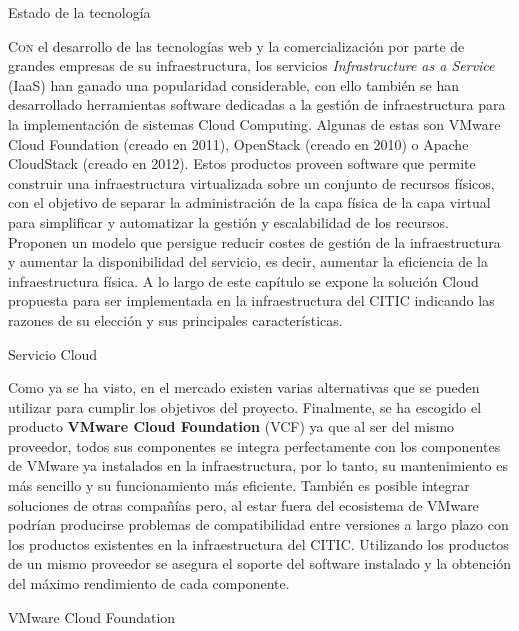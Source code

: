 \begin{chapter}{Estado de la tecnología}
    
    \lettrine{C}{on} el desarrollo de las tecnologías web y la comercialización por parte de grandes empresas de su infraestructura, los servicios \textit{Infrastructure as a Service} (IaaS) han ganado una popularidad considerable, con ello también se han desarrollado herramientas software dedicadas a la gestión de infraestructura para la implementación de sistemas Cloud Computing. Algunas de estas son VMware Cloud Foundation (creado en 2011), OpenStack (creado en 2010) o Apache CloudStack (creado en 2012). Estos productos proveen software que permite construir una infraestructura virtualizada sobre un conjunto de recursos físicos, con el objetivo de separar la administración de la capa física de la capa virtual para simplificar y automatizar la gestión y escalabilidad de los recursos. Proponen un modelo que persigue reducir costes de gestión de la infraestructura y aumentar la disponibilidad del servicio, es decir, aumentar la eficiencia de la infraestructura física.
    A lo largo de este capítulo se expone la solución Cloud propuesta para ser implementada en la infraestructura del CITIC indicando las razones de su elección y sus principales características.

\begin{section}{Servicio Cloud}    

    Como ya se ha visto, en el mercado existen varias alternativas que se pueden utilizar para cumplir los objetivos del proyecto. Finalmente, se ha escogido el producto \textbf{VMware Cloud Foundation} (VCF) ya que al ser del mismo proveedor, todos sus componentes se integra perfectamente con los componentes de VMware ya instalados en la infraestructura, por lo tanto, su mantenimiento es más sencillo y su funcionamiento más eficiente. También es posible integrar soluciones de otras compañías pero, al estar fuera del ecosistema de VMware podrían producirse problemas de compatibilidad entre versiones a largo plazo con los productos existentes en la infraestructura del CITIC. Utilizando los productos de un mismo proveedor se asegura el soporte del software instalado y la obtención del máximo rendimiento de cada componente.
        
    \begin{subsection}{VMware Cloud Foundation}
    

\end{subsection}
\end{section}
\end{chapter}
